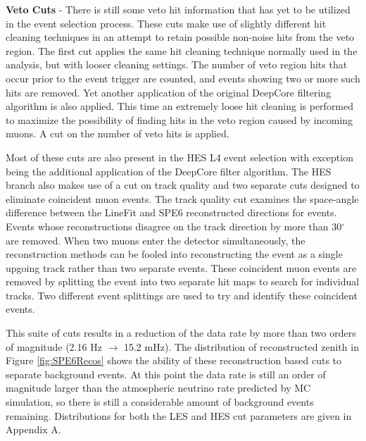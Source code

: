 \documentclass{gatech-thesis}
\begin{document}
\begin{adjustwidth}{2.5em}{2.5em}
\textbf{Veto Cuts} - There is still some veto hit information that has yet to be utilized in the event selection process. These cuts make use of slightly different hit cleaning techniques in an attempt to retain possible non-noise hits from the veto region. The first cut applies the same hit cleaning technique normally used in the analysis, but with looser cleaning settings. The number of veto region hits that occur prior to the event trigger are counted, and events showing two or more such hits are removed. Yet another application of the original DeepCore filtering algorithm is also applied. This time an extremely loose hit cleaning is performed to maximize the possibility of finding hits in the veto region caused by incoming muons. A cut on the number of veto hits is applied.
\end{adjustwidth}
\setlength{\parindent}{17.5pt}

Most of these cuts are also present in the HES L4 event selection with exception being the additional application of the DeepCore filter algorithm. The HES branch also makes use of a cut on track quality and two separate cuts designed to eliminate coincident muon events. The track quality cut examines the space-angle difference between the LineFit and SPE6 reconstructed directions for events. Events whose reconstructions disagree on the track direction by more than 30$^{\circ}$ are removed. When two muons enter the detector simultaneously, the reconstruction methods can be fooled into reconstructing the event as a single upgoing track rather than two separate events. These coincident muon events are removed by splitting the event into two separate hit maps to search for individual tracks. Two different event splittings are used to try and identify these coincident events.

This suite of cuts results in a reduction of the data rate by more than two orders of magnitude (2.16 Hz $\rightarrow$ 15.2 mHz). The distribution of reconstructed zenith in Figure \ref{fig:SPE6Recos} shows the ability of these reconstruction based cuts to separate background events. At this point the data rate is still an order of magnitude larger than the atmospheric neutrino rate predicted by MC simulation, so there is still a considerable amount of background events remaining. Distributions for both the LES and HES cut parameters are given in Appendix A.
\end{document}
